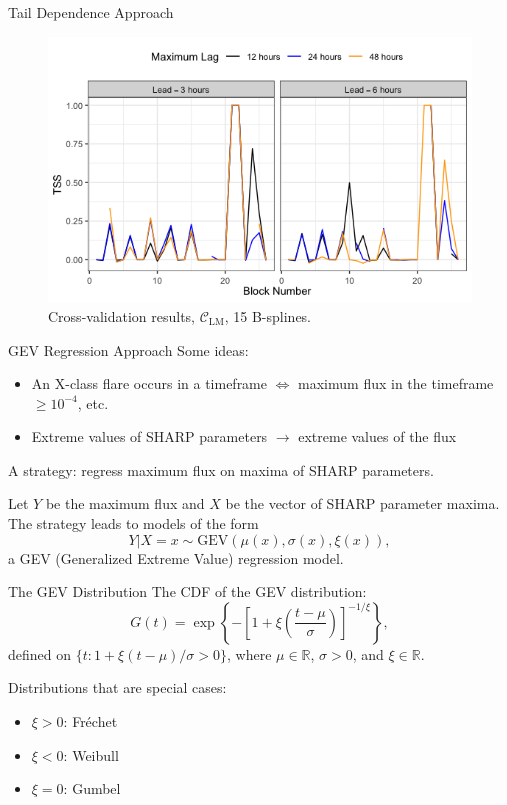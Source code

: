 \documentclass{beamer}
\begin{document}
\begin{frame}{Tail Dependence Approach}
    \begin{figure}
        \centering
        \includegraphics[scale=0.5]{group05_cv_study01_tss.png}
        \caption{Cross-validation results, $\mathcal{C}_{\text{LM}}$, 15 B-splines.}
        \label{fig:group05_cv_study01_tss}
    \end{figure}
\end{frame}

\begin{frame}{GEV Regression Approach}
    Some ideas:
    \begin{itemize}
        \item An X-class flare occurs in a timeframe $\iff$ maximum flux in the timeframe $\ge 10^{-4}$, etc.
        \item Extreme values of SHARP parameters $\rightarrow$ extreme values of the flux
    \end{itemize}
    A strategy: regress maximum flux on maxima of SHARP parameters.

    \smallskip

    Let $Y$ be the maximum flux and $X$ be the vector of SHARP parameter maxima. The strategy leads to models of the form
    \[
    Y | X = x \sim \text{GEV}(\mu(x), \sigma(x), \xi(x)),
    \]
    a GEV (Generalized Extreme Value) regression model.
\end{frame}

\begin{frame}{The GEV Distribution}
    The CDF of the GEV distribution:
    \[
    G(t) = \exp\left\{-\left[1 + \xi\left(\frac{t - \mu}{\sigma}\right)\right]^{-1 / \xi}\right\},
    \]
    defined on $\{t : 1 + \xi(t - \mu) / \sigma > 0\}$, where $\mu \in \mathbb{R}$, $\sigma > 0$, and $\xi \in \mathbb{R}$.

    Distributions that are special cases:
    \begin{itemize}
        \item $\xi > 0$: Fr\'{e}chet
        \item $\xi < 0$: Weibull
        \item $\xi = 0$: Gumbel
    \end{itemize}
\end{frame}
\end{document}
